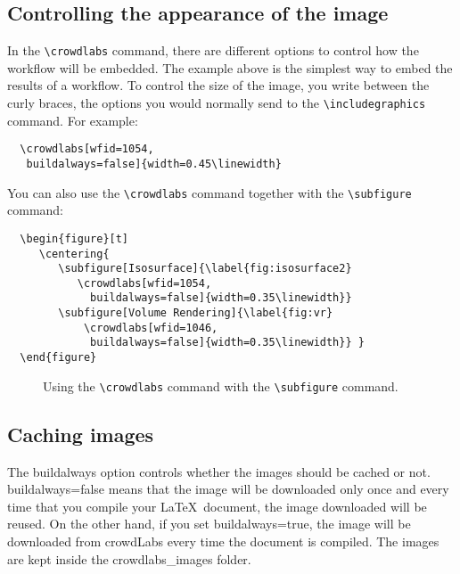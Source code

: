 \documentclass{article}
\begin{document}
\subsection{Controlling the appearance of the image}
In the \texttt{\textbackslash crowdlabs} command, there are different options to control how the workflow will be embedded. The example above is the simplest way to embed the results of a workflow. To control the size of the image, you write between the curly braces, the options you would normally send to the  \texttt{\textbackslash includegraphics} command. For example:  

\begin{verbatim}
  \crowdlabs[wfid=1054,
   buildalways=false]{width=0.45\linewidth}
\end{verbatim}

You can also use the \texttt{\textbackslash crowdlabs} command together with the \texttt{\textbackslash subfigure} command:
\begin{verbatim}
  \begin{figure}[t]
     \centering{
        \subfigure[Isosurface]{\label{fig:isosurface2}  
           \crowdlabs[wfid=1054,
             buildalways=false]{width=0.35\linewidth}}
        \subfigure[Volume Rendering]{\label{fig:vr}  
            \crowdlabs[wfid=1046,
             buildalways=false]{width=0.35\linewidth}} }
  \end{figure}
\end{verbatim}

\begin{figure}[t]
\caption{Using the \texttt{\textbackslash crowdlabs} command with the \texttt{\textbackslash subfigure} command.}
\label{fig:subfigure}
\end{figure}

\subsection{Caching images}
The \textsf{buildalways} option controls whether the images should be cached or not. \textsf{buildalways=false} means that the image will be downloaded only once and every time that you compile your \LaTeX\ document, the image downloaded will be reused. On the other hand, if you set \textsf{buildalways=true}, the image will be downloaded from crowdLabs every time the document is compiled. The images are kept inside the \textsf{crowdlabs\_images} folder.
\end{document}
